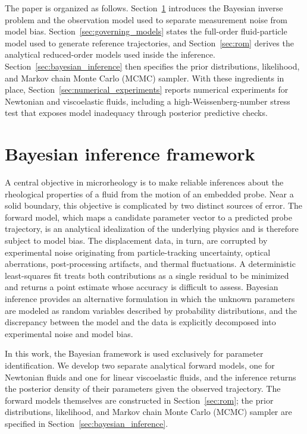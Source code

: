 \documentclass{elsarticle}
\begin{document}
The paper is organized as follows.
Section~\ref{sec:bayes} introduces the Bayesian inverse problem and the
observation model used to separate measurement noise from model bias.
Section~\ref{sec:governing_models} states the full-order
fluid-particle model used to generate reference trajectories, and
Section~\ref{sec:rom} derives the analytical reduced-order models used
inside the inference. Section~\ref{sec:bayesian_inference} then
specifies the prior distributions, likelihood, and Markov chain Monte
Carlo (MCMC) sampler. With these ingredients in place,
Section~\ref{sec:numerical_experiments} reports numerical experiments
for Newtonian and viscoelastic fluids, including a high-Weissenberg-number
stress test that exposes model inadequacy through posterior predictive
checks.

\section{Bayesian inference framework}
\label{sec:bayes}

A central objective in microrheology is to make reliable inferences
about the rheological properties of a fluid from the motion of an
embedded probe. Near a solid boundary, this objective is complicated
by two distinct sources of error. The forward model, which maps a
candidate parameter vector to a predicted probe trajectory, is an
analytical idealization of the underlying physics and is therefore
subject to model bias. The displacement data, in turn, are corrupted
by experimental noise originating from particle-tracking
uncertainty, optical aberrations, post-processing artifacts, 
and thermal fluctuations. A deterministic least-squares fit
treats both contributions as a single residual to be minimized and
returns a point estimate whose accuracy is difficult to assess. Bayesian
inference provides an alternative formulation in which the unknown
parameters are modeled as random variables described by probability
distributions, and the discrepancy between the model and the data is explicitly decomposed into experimental noise and model bias.

In this work, the Bayesian framework is used exclusively for parameter
identification. We develop two separate analytical forward models, one
for Newtonian fluids and one for linear viscoelastic fluids, and the
inference returns the posterior density of their parameters given the
observed trajectory. The forward models themselves are constructed in
Section~\ref{sec:rom}; the prior distributions, likelihood, and Markov
chain Monte Carlo (MCMC) sampler are specified in
Section~\ref{sec:bayesian_inference}.
\end{document}
